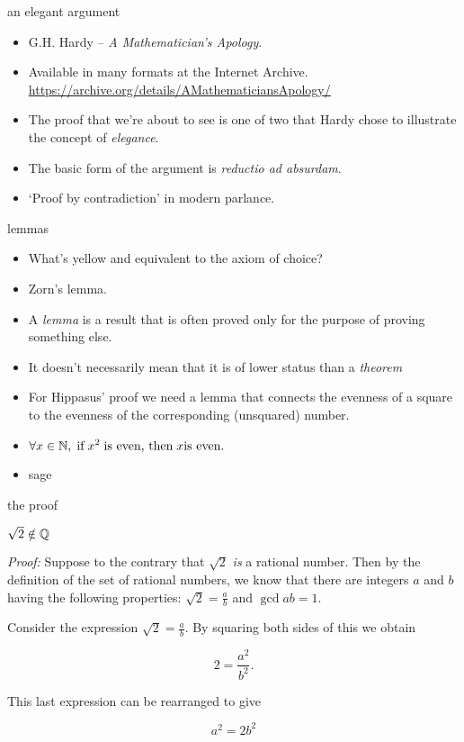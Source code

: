 \documentclass[landscape]{beamer}
\begin{document}
\begin{frame}{an elegant argument}
\begin{itemize}
\item G.H. Hardy -- {\em A Mathematician's Apology}. \pause
\item Available in many formats at the Internet Archive.\newline
\href{https://archive.org/details/AMathematiciansApology/}{https://archive.org/details/AMathematiciansApology/} \pause
\item The proof that we're about to see is one of two that Hardy chose to illustrate the concept of {\em elegance}. \pause
\item The basic form of the argument is {\em reductio ad absurdam}. \pause
\item `Proof by contradiction' in modern parlance.
\end{itemize}
\end{frame}

\begin{frame}{lemmas}
\begin{itemize}
\item What's yellow and equivalent to the axiom of choice? \pause
\item Zorn's lemma. \pause
\item A {\em lemma} is a result that is often proved only for the purpose of proving something else. \pause
\item It doesn't necessarily mean that it is of lower status than a {\em theorem}\textellipsis
\pause
\item For Hippasus' proof we need a lemma that connects the evenness of a square to the evenness of the corresponding (unsquared) number. \pause
\item $\displaystyle \forall x \in {\mathbb N}, \; \mbox{if} \; x^2 \; \mbox{is even, then} \; x \mbox{is even}.$ \pause
\item sage 
\end{itemize}
\end{frame}

\begin{frame}{the proof}

\begin{theorem}
$\sqrt{2} \notin {\mathbb Q}$
\end{theorem}

\emph{Proof:}
Suppose to the contrary that $\sqrt{2}$ {\em is} a rational number.
Then by the definition of the set of rational numbers, we know that
there are integers 
$a$ and $b$ having the following properties: 
$\displaystyle \sqrt{2} = \frac{a}{b}$ and $\gcd{a}{b} = 1$.  

Consider the expression $\displaystyle \sqrt{2} = \frac{a}{b}$.   
By squaring both sides of this we obtain

\[ 2 = \frac{a^2}{b^2}. \]

This last expression can be rearranged to give

\begin{equation*}
a^2 = 2 b^2
\end{equation*}
\end{frame}
\end{document}
